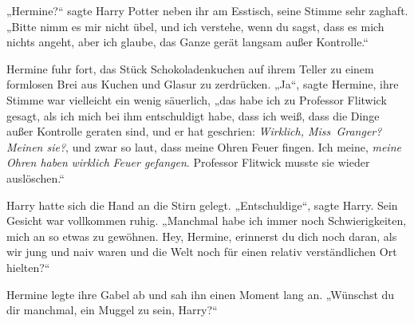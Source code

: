 „Hermine?“ sagte Harry Potter neben ihr am Esstisch, seine Stimme sehr zaghaft.
„Bitte nimm es mir nicht übel, und ich verstehe, wenn du sagst, dass es mich nichts angeht, aber ich glaube, das Ganze gerät langsam außer Kontrolle.“

Hermine fuhr fort, das Stück Schokoladenkuchen auf ihrem Teller zu einem formlosen Brei aus Kuchen und Glasur zu zerdrücken.
„Ja“, sagte Hermine, ihre Stimme war vielleicht ein wenig säuerlich, „das habe ich zu Professor Flitwick gesagt, als ich mich bei ihm entschuldigt habe, dass ich weiß, dass die Dinge außer Kontrolle geraten sind, und er hat geschrien: \emph{Wirklich, Miss~Granger? Meinen sie?}, und zwar so laut, dass meine Ohren Feuer fingen. Ich meine, \emph{meine Ohren haben} \emph{wirklich} \emph{Feuer gefangen}. Professor Flitwick musste sie wieder auslöschen.“

Harry hatte sich die Hand an die Stirn gelegt.
„Entschuldige“, sagte Harry. Sein Gesicht war vollkommen ruhig.
„Manchmal habe ich immer noch Schwierigkeiten, mich an so etwas zu gewöhnen. Hey, Hermine, erinnerst du dich noch daran, als wir jung und naiv waren und die Welt noch für einen relativ verständlichen Ort hielten?“

Hermine legte ihre Gabel ab und sah ihn einen Moment lang an.
„Wünschst du dir manchmal, ein Muggel zu sein, Harry?“

